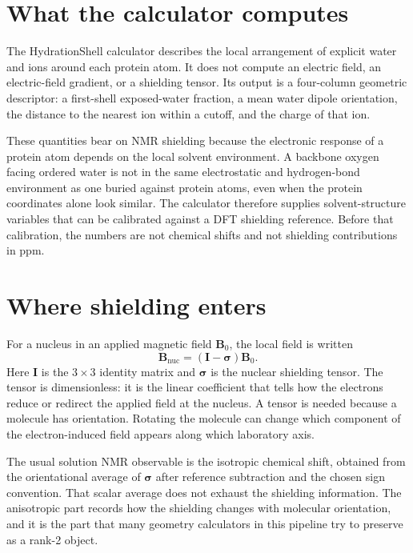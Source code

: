 \documentclass[11pt]{article}
\begin{document}

\section{What the calculator computes}

The HydrationShell calculator describes the local arrangement of explicit water
and ions around each protein atom. It does not compute an electric field, an
electric-field gradient, or a shielding tensor. Its output is a four-column
geometric descriptor: a first-shell exposed-water fraction, a mean water dipole
orientation, the distance to the nearest ion within a cutoff, and the charge of
that ion.

These quantities bear on NMR shielding because the electronic response of a
protein atom depends on the local solvent environment. A backbone oxygen facing
ordered water is not in the same electrostatic and hydrogen-bond environment as
one buried against protein atoms, even when the protein coordinates alone look
similar. The calculator therefore supplies solvent-structure variables that can
be calibrated against a DFT shielding reference. Before that calibration, the
numbers are not chemical shifts and not shielding contributions in ppm.

\section{Where shielding enters}

For a nucleus in an applied magnetic field \(\bm B_0\), the local field is
written
\begin{equation}
  \bm B_{\mathrm{nuc}} = (\bm I-\bm\sigma)\bm B_0 .
  \label{eq:shielding}
\end{equation}
Here \(\bm I\) is the \(3\times3\) identity matrix and \(\bm\sigma\) is the
nuclear shielding tensor. The tensor is dimensionless: it is the linear
coefficient that tells how the electrons reduce or redirect the applied field at
the nucleus. A tensor is needed because a molecule has orientation. Rotating the
molecule can change which component of the electron-induced field appears along
which laboratory axis.

The usual solution NMR observable is the isotropic chemical shift, obtained from
the orientational average of \(\bm\sigma\) after reference subtraction and the
chosen sign convention. That scalar average does not exhaust the shielding
information. The anisotropic part records how the shielding changes with
molecular orientation, and it is the part that many geometry calculators in this
pipeline try to preserve as a rank-2 object.
\end{document}

